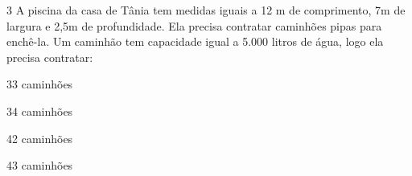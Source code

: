 

\num{3} A piscina da casa de Tânia tem medidas iguais a 12 m de comprimento,
7m de largura e 2,5m de profundidade. Ela precisa contratar caminhões
pipas para enchê-la. Um caminhão tem capacidade igual a 5.000 litros de
água, logo ela precisa contratar:

\begin{escolha}
\item 33 caminhões
\item 34 caminhões
\item 42 caminhões
\item 43 caminhões
\end{escolha}



